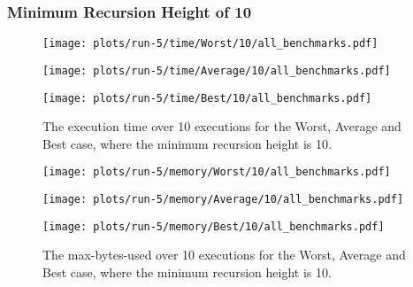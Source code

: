 \subsubsection{Minimum Recursion Height of 10}
\begin{figure}[H]
  \begin{minipage}{.5\textwidth}
    \centering
    \texttt{[image: plots/run-5/time/Worst/10/all\_benchmarks.pdf]}  
  \end{minipage}
  \begin{minipage}{.5\textwidth}
    \centering
    \texttt{[image: plots/run-5/time/Average/10/all\_benchmarks.pdf]}  
  \end{minipage}
  \begin{center}
    \begin{minipage}[c]{.5\textwidth}
      \centering
      \texttt{[image: plots/run-5/time/Best/10/all\_benchmarks.pdf]}  
    \end{minipage}
  \end{center}
  \caption{The execution time over 10 executions for the Worst, Average and Best case, where the minimum recursion height is 10.}
\end{figure}
\begin{figure}[H]
  \begin{minipage}{.5\textwidth}
    \centering
    \texttt{[image: plots/run-5/memory/Worst/10/all\_benchmarks.pdf]}  
  \end{minipage}
  \begin{minipage}{.5\textwidth}
    \centering
    \texttt{[image: plots/run-5/memory/Average/10/all\_benchmarks.pdf]}  
  \end{minipage}
  \begin{center}
    \begin{minipage}[c]{.5\textwidth}
      \centering
      \texttt{[image: plots/run-5/memory/Best/10/all\_benchmarks.pdf]}  
    \end{minipage}
  \end{center}
  \caption{The max-bytes-used over 10 executions for the Worst, Average and Best case, where the minimum recursion height is 10.}
\end{figure}